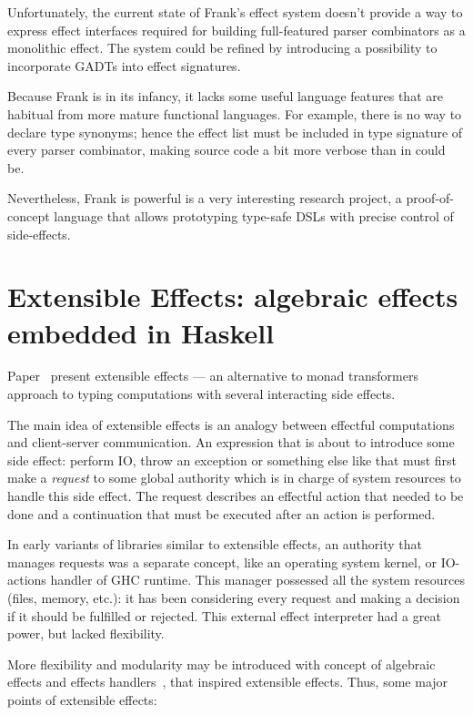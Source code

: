     Unfortunately, the current state of Frank's effect system doesn't provide a way
    to express effect interfaces required for building full-featured parser combinators
    as a monolithic effect. The system could be refined by introducing a possibility
    to incorporate GADTs into effect signatures.

    Because Frank is in its infancy, it lacks some useful language features that
    are habitual from more mature functional languages. For example, there is no
    way to declare type synonyms; hence the
    effect list must be included in type signature of every parser combinator, making
    source code a bit more verbose than in could be.

    Nevertheless, Frank is powerful is a very interesting research project, a
    proof-of-concept language that allows prototyping type-safe DSLs with precise
    control of side-effects.

    \section{Extensible Effects: algebraic effects embedded in Haskell}
    \label{cpt-alg-eff:ext-effects}

    Paper~\cite{Kiselyov:2013:EEA:2578854.2503791} present extensible effects ---
    an alternative to monad transformers
    approach to typing computations with several interacting side effects.

    The main idea of extensible effects is an analogy between effectful computations and
    client-server communication. An expression that is about to introduce some side effect:
    perform IO, throw an exception or something else like that must first make a \emph{request}
    to some global authority which is in charge of system resources to handle this side effect.
    The request describes an effectful action that needed to be done and a continuation that
    must be executed after an action is performed.

    In early variants of libraries similar to extensible effects, an authority that manages
    requests was a separate concept, like an operating system kernel, or IO-actions
    handler of GHC runtime. This manager possessed all the system resources (files,
    memory, etc.): it has been considering every request and making a decision if it should be
    fulfilled or rejected. This external effect interpreter had a great power, but lacked
    flexibility.

    More flexibility and modularity may be introduced with concept of algebraic effects and
    effects handlers~\cite{DBLP:journals/jlp/BauerP15}, that inspired extensible effects.
    Thus, some major points of extensible effects:

